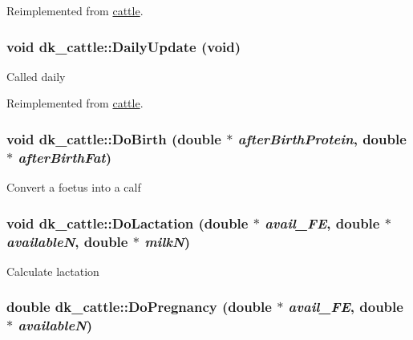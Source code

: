 Reimplemented from \hyperlink{classcattle_a42b73eb64c061427ced81f8524ea76a9}{cattle}.\hypertarget{classdk__cattle_a33ea8994d985d00a3c0910a44e7c5d15}{
\subsubsection[{DailyUpdate}]{\setlength{\rightskip}{0pt plus 5cm}void dk\_\-cattle::DailyUpdate (void)}}
\label{classdk__cattle_a33ea8994d985d00a3c0910a44e7c5d15}
Called daily 

Reimplemented from \hyperlink{classcattle_a418e7ccadab4a1b2b71d5687c4f22373}{cattle}.\hypertarget{classdk__cattle_ab17aa2f9b98e96a0175282b988a23d5a}{
\subsubsection[{DoBirth}]{\setlength{\rightskip}{0pt plus 5cm}void dk\_\-cattle::DoBirth (double $\ast$ {\em afterBirthProtein}, \/  double $\ast$ {\em afterBirthFat})}}
\label{classdk__cattle_ab17aa2f9b98e96a0175282b988a23d5a}
Convert a foetus into a calf \hypertarget{classdk__cattle_a809188c9cd87733a145f334208cc6e85}{
\subsubsection[{DoLactation}]{\setlength{\rightskip}{0pt plus 5cm}void dk\_\-cattle::DoLactation (double $\ast$ {\em avail\_\-FE}, \/  double $\ast$ {\em availableN}, \/  double $\ast$ {\em milkN})}}
\label{classdk__cattle_a809188c9cd87733a145f334208cc6e85}
Calculate lactation \hypertarget{classdk__cattle_af9b81a29747448215d0dccfae641ee3a}{
\subsubsection[{DoPregnancy}]{\setlength{\rightskip}{0pt plus 5cm}double dk\_\-cattle::DoPregnancy (double $\ast$ {\em avail\_\-FE}, \/  double $\ast$ {\em availableN})}}
